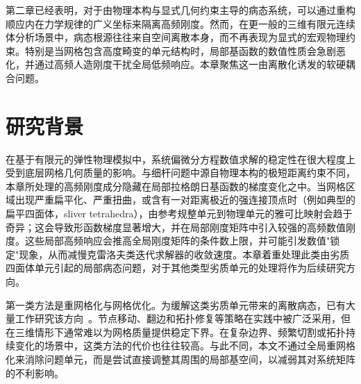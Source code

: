 第二章已经表明，对于由物理本构与显式几何约束主导的病态系统，可以通过重构顺应内在力学规律的广义坐标来隔离高频刚度。然而，在更一般的三维有限元连续体分析场景中，病态根源往往来自空间离散本身，而不再表现为显式的宏观物理约束。特别是当网格包含高度畸变的单元结构时，局部基函数的数值性质会急剧恶化，并通过高频人造刚度干扰全局低频响应。本章聚焦这一由离散化诱发的软硬耦合问题。

\section{研究背景}

在基于有限元的弹性物理模拟中，系统偏微分方程数值求解的稳定性在很大程度上受到底层网格几何质量的影响。与细杆问题中源自物理本构的极短距离约束不同，本章所处理的高频刚度成分隐藏在局部拉格朗日基函数的梯度变化之中。当网格区域出现严重扁平化、严重扭曲，或含有一对距离极近的强连接顶点时（例如典型的扁平四面体，sliver tetrahedra），由参考规整单元到物理单元的雅可比映射会趋于奇异；这会导致形函数梯度显著增大，并在局部刚度矩阵中引入较强的高频数值刚度。这些局部高频响应会推高全局刚度矩阵的条件数上限，并可能引发数值"锁定"现象，从而减慢克雷洛夫类迭代求解器的收敛速度。本章着重处理此类由劣质四面体单元引起的局部病态问题，对于其他类型劣质单元的处理将作为后续研究方向。

第一类方法是重网格化与网格优化。为缓解这类劣质单元带来的离散病态，已有大量工作研究该方向~\cite{RH2005EliminateSlivers}。节点移动、翻边和拓扑修复等策略在实践中被广泛采用，但在三维情形下通常难以为网格质量提供稳定下界。在复杂边界、频繁切割或拓扑持续变化的场景中，这类方法的代价也往往较高。与此不同，本文不通过全局重网格化来消除问题单元，而是尝试直接调整其周围的局部基空间，以减弱其对系统矩阵的不利影响。

